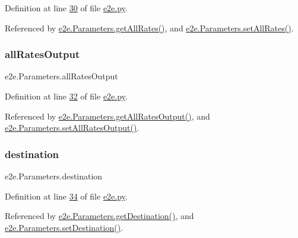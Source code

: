 Definition at line \hyperlink{e2e_8py_source_l00030}{30} of file \hyperlink{e2e_8py_source}{e2e.\+py}.



Referenced by \hyperlink{e2e_8py_source_l00064}{e2e.\+Parameters.\+get\+All\+Rates()}, and \hyperlink{e2e_8py_source_l00061}{e2e.\+Parameters.\+set\+All\+Rates()}.

\mbox{\label{classe2e_1_1_parameters_ac5dfd879a297879921d905de68f7febb}} 
\subsubsection{\texorpdfstring{all\+Rates\+Output}{allRatesOutput}}
{\footnotesize\ttfamily e2e.\+Parameters.\+all\+Rates\+Output}



Definition at line \hyperlink{e2e_8py_source_l00032}{32} of file \hyperlink{e2e_8py_source}{e2e.\+py}.



Referenced by \hyperlink{e2e_8py_source_l00076}{e2e.\+Parameters.\+get\+All\+Rates\+Output()}, and \hyperlink{e2e_8py_source_l00073}{e2e.\+Parameters.\+set\+All\+Rates\+Output()}.

\mbox{\label{classe2e_1_1_parameters_ad2cdf746b8890c53a9cab6fd7df7043b}} 
\subsubsection{\texorpdfstring{destination}{destination}}
{\footnotesize\ttfamily e2e.\+Parameters.\+destination}



Definition at line \hyperlink{e2e_8py_source_l00034}{34} of file \hyperlink{e2e_8py_source}{e2e.\+py}.



Referenced by \hyperlink{e2e_8py_source_l00088}{e2e.\+Parameters.\+get\+Destination()}, and \hyperlink{e2e_8py_source_l00085}{e2e.\+Parameters.\+set\+Destination()}.

\mbox{\label{classe2e_1_1_parameters_a3b4ae5aa9b73466e51018b6f37792577}} 
